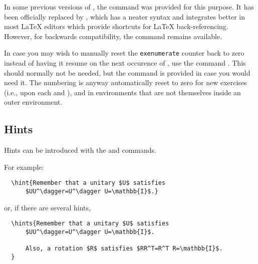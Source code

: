 \documentclass[11pt,a4paper]{article}
\begin{document}
\begin{pkgnotice}
  In some previous versions of \ethuebung{}, the command  was
  provided for this purpose. It has been officially replaced by
  , which has a neater syntax and integrates better in
  most \LaTeX{} editors which provide shortcuts for \LaTeX{} back-referencing. However,
  for backwards compatibility, the command  remains available.
\end{pkgnotice}

In case you may wish to manually reset the \texttt{exenumerate} counter back to zero
instead of having it resume on the next occurence of , use the
command . This 
should normally not be needed, but the command is provided in case you would need it. The
numbering is anyway automatically reset to zero for new exercises (i.e., upon each
 and ), and in  environments that are not
themselves inside an outer  environment. 



\subsection{Hints}
\label{sec:Hints}

Hints can be introduced with the  and  commands.



For example:
\begin{pkgverbatim}
\begin{verbatim}
  \hint{Remember that a unitary $U$ satisfies
      $UU^\dagger=U^\dagger U=\mathbb{I}$.}
\end{verbatim}
\end{pkgverbatim}
or, if there are several hints,
\begin{pkgverbatim}
\begin{verbatim}
  \hints{Remember that a unitary $U$ satisfies
      $UU^\dagger=U^\dagger U=\mathbb{I}$.

      Also, a rotation $R$ satisfies $RR^T=R^T R=\mathbb{I}$.
  }
\end{verbatim}
\end{pkgverbatim}
\end{document}
